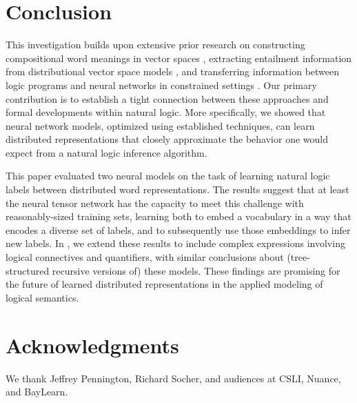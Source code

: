 \documentclass[letterpaper]{article}
\begin{document}
\section{Conclusion}\label{sec:discussion}

This investigation builds upon extensive prior research on
constructing compositional word meanings in vector spaces
\cite{ClarkCoeckeSadrzadeh2011,grefenstette2013towards,Hermann-etal:2013,rocktaschellow},
extracting entailment information from distributional vector space
models \cite{baroni2012entailment,rei2014looking}, and transferring
information between logic programs and neural networks in constrained
settings \cite{hitzler2004logic,holldobler1999approximating}. Our
primary contribution is to establish a tight connection between these
approaches and formal developments within natural logic.  More
specifically, we showed that neural network models, optimized using
established techniques, can learn distributed representations that
closely approximate the behavior one would expect from a natural logic
inference algorithm.


This paper evaluated two neural models on the task of learning 
natural logic labels between distributed word representations. The
results suggest that at least the neural tensor network
has the capacity to
meet this challenge with reasonably-sized training sets, learning both 
to embed a vocabulary in a way that encodes a diverse
set of labels, and to subsequently use those embeddings to infer new
labels. In
\cite{Bowman:Potts:Manning:2014}, we extend these results to include
complex expressions involving logical connectives and quantifiers, with similar
conclusions about (tree-structured recursive versions of) these models. These findings
are promising for the future of learned distributed representations in the
applied modeling of logical semantics.

\section{Acknowledgments}

We thank Jeffrey Pennington, Richard Socher, and audiences at CSLI, Nuance, and BayLearn.


 
 
\end{document}
